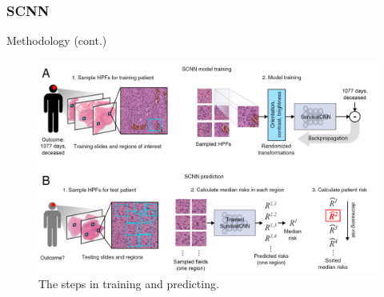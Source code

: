 \documentclass{beamer}
\begin{document}
	\begin{frame}
		\frametitle{SCNN}
		Methodology (cont.)
		
		\begin{figure}[H]
			\centering
			\includegraphics[scale=0.12]{figures/scnn-train-pred.png}
			\caption{The steps in training and predicting.}
			\label{fig:scnn-overall}
		\end{figure}
	\end{frame}

	\begin{frame}[allowframebreaks]
		\begin{singlespace}
			
			
		\end{singlespace}
	\end{frame}
	
\end{document}
